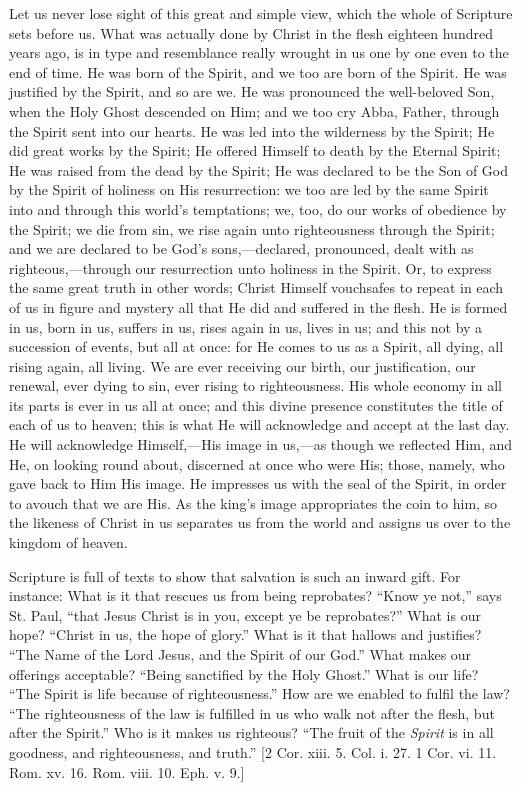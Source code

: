 Let us never lose sight of this great and simple view, which the
whole of Scripture sets before us. What was actually done by Christ in
the flesh eighteen hundred years ago, is in type and resemblance
really wrought in us one by one even to the end of time. He was born
of the Spirit, and we too are born of the Spirit. He was justified by
the Spirit, and so are we. He was pronounced the well-beloved Son,
when the Holy Ghost descended on Him; and we too cry Abba, Father,
through the Spirit sent into our hearts. He was led into the
wilderness by the Spirit; He did great works by the Spirit; He offered
Himself to death by the Eternal Spirit; He was raised from the dead by
the Spirit; He was declared to be the Son of God by the Spirit of
holiness on His resurrection: we too are led by the same Spirit into
and through this world's temptations; we, too, do our works of
obedience by the Spirit; we die from sin, we rise again unto
righteousness through the Spirit; and we are declared to be God's
sons,—declared, pronounced, dealt with as righteous,—through our
resurrection unto holiness in the Spirit. Or, to express the same
great truth in other words; Christ Himself vouchsafes to repeat in
each of us in figure and mystery all that He did and suffered in the
flesh. He is formed in us, born in us, suffers in us, rises again in
us, lives in us; and this not by a succession of events, but all at
once: for He comes to us as a Spirit, all dying, all rising again, all
living. We are ever receiving our birth, our justification, our
renewal, ever dying to sin, ever rising to righteousness. His whole
economy in all its parts is ever in us all at once; and this divine
presence constitutes the title of each of us to heaven; this is what
He will acknowledge and accept at the last day. He will acknowledge
Himself,—His image in us,—as though we reflected Him, and He, on
looking round about, discerned at once who were His; those, namely,
who gave back to Him His image. He impresses us with the seal of the
Spirit, in order to avouch that we are His. As the king's image
appropriates the coin to him, so the likeness of Christ in us
separates us from the world and assigns us over to the kingdom of
heaven.

Scripture is full of texts to show that salvation is such an inward
gift. For instance: What is it that rescues us from being reprobates?
``Know ye not,'' says St. Paul, ``that Jesus Christ is in
you, except ye be reprobates?'' What is our hope? ``Christ in
us, the hope of glory.'' What is it that hallows and justifies?
``The Name of the Lord Jesus, and the Spirit of our God.''
What makes our offerings acceptable? ``Being sanctified by the
Holy Ghost.'' What is our life? ``The Spirit is life because
of righteousness.'' How are we enabled to fulfil the law?
``The righteousness of the law is fulfilled in us who walk not
after the flesh, but after the Spirit.'' Who is it makes us
righteous? ``The fruit of the \emph{Spirit} is in all goodness,
and righteousness, and truth.'' [2 Cor. xiii. 5. Col. i. 27. 1 Cor.
vi. 11. Rom. xv. 16. Rom. viii. 10. Eph. v. 9.]

